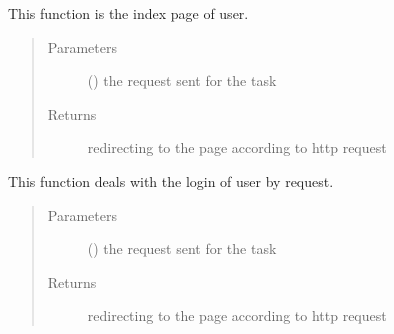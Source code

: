\documentclass[letterpaper,10pt,english]{sphinxmanual}
\begin{document}
\begin{fulllineitems}
\label{\detokenize{janta:janta.views.index}}
This function is the index page of user.
\begin{quote}\begin{description}
\item[{Parameters}] \leavevmode
{} () \textendash{} the request sent for the task

\item[{Returns}] \leavevmode
redirecting to the page according to http request

\end{description}\end{quote}

\end{fulllineitems}


\begin{fulllineitems}
\label{\detokenize{janta:janta.views.login}}
This function deals with the login of user by request.
\begin{quote}\begin{description}
\item[{Parameters}] \leavevmode
{} () \textendash{} the request sent for the task

\item[{Returns}] \leavevmode
redirecting to the page according to http request

\end{description}\end{quote}

\end{fulllineitems}

\end{document}
